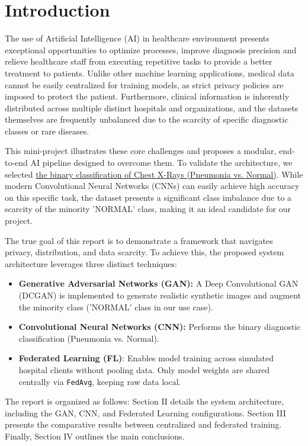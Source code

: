 \section{Introduction}

The use of Artificial Intelligence (AI) in healthcare environment
presents exceptional opportunities to optimize processes, improve
diagnosis precision and relieve healthcare staff from executing
repetitive tasks to provide a better treatment to patients. Unlike other
machine learning applications, medical data cannot be easily
centralized for training models, as strict privacy policies are
imposed to protect the patient. Furthermore, clinical information is
inherently distributed across multiple distinct hospitals and
organizations, and the datasets themselves are frequently unbalanced
due to the scarcity of specific diagnostic classes or rare diseases.

This mini-project illustrates these core challenges and proposes a
modular, end-to-end AI pipeline designed to overcome them. To validate
the architecture, we selected
\href{https://www.kaggle.com/datasets/paultimothymooney/chest-xray-pneumonia}{the
  binary classification of Chest X-Rays (Pneumonia vs. Normal)}. While
modern Convolutional Neural
Networks (CNNs) can easily achieve high accuracy on this specific
task, the dataset presents a significant class imbalance due to a
scarcity of the minority 'NORMAL' class, making it an ideal candidate
for our project.

The true goal of this report is to demonstrate a framework that
navigates privacy, distribution, and data scarcity. To achieve this,
the proposed system architecture leverages three distinct
techniques: 
\begin{itemize}
\item \textbf{Generative Adversarial Networks (GAN):} A Deep
  Convolutional GAN (DCGAN) is implemented to generate realistic
  synthetic images and augment the minority class ('NORMAL' class in
  our use case).
  
\item \textbf{Convolutional Neural Networks (CNN):} Performs the
  binary diagnostic classification (Pneumonia vs. Normal).
  
\item \textbf{Federated Learning (FL)}: Enables model training across
  simulated hospital clients without pooling data. Only model weights
  are shared centrally via \texttt{FedAvg}, keeping raw data local.
\end{itemize}

The report is organized as follows: Section II
details the system architecture, including the GAN, CNN, and Federated
Learning configurations. Section III presents the comparative results
between centralized and federated training. Finally, Section IV
outlines the main conclusions.